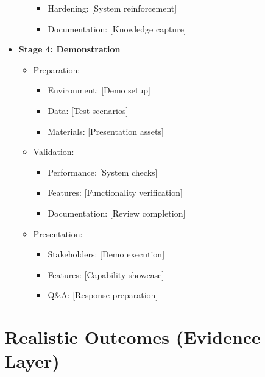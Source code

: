 \documentclass{article}
\begin{document}
\begin{itemize}
\begin{itemize}
\begin{itemize}
            \item Hardening: [System reinforcement]
            \item Documentation: [Knowledge capture]
        \end{itemize}
    \end{itemize}
     \item \textbf{Stage 4: Demonstration}
    \begin{itemize}
        \item Preparation:
        \begin{itemize}
            \item Environment: [Demo setup]
            \item Data: [Test scenarios]
            \item Materials: [Presentation assets]
        \end{itemize}
        \item Validation:
        \begin{itemize}
            \item Performance: [System checks]
            \item Features: [Functionality verification]
            \item Documentation: [Review completion]
        \end{itemize}
        \item Presentation:
        \begin{itemize}
            \item Stakeholders: [Demo execution]
            \item Features: [Capability showcase]
            \item Q\&A: [Response preparation]
        \end{itemize}
    \end{itemize}
\end{itemize}
\section{Realistic Outcomes (Evidence Layer)}
\end{document}
